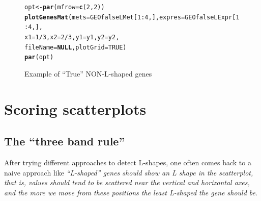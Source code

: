 \documentclass[a4paper,10pt]{article}\usepackage[]{graphicx}\usepackage[]{xcolor}
\makeatletter
\newcommand{\hlnum}[1]{\textcolor[rgb]{0.686,0.059,0.569}{#1}}%
\newcommand{\hlopt}[1]{\textcolor[rgb]{0,0,0}{#1}}%
\newcommand{\hlstd}[1]{\textcolor[rgb]{0.345,0.345,0.345}{#1}}%
\newcommand{\hlkwa}[1]{\textcolor[rgb]{0.161,0.373,0.58}{\textbf{#1}}}%
\newcommand{\hlkwb}[1]{\textcolor[rgb]{0.69,0.353,0.396}{#1}}%
\newcommand{\hlkwc}[1]{\textcolor[rgb]{0.333,0.667,0.333}{#1}}%
\newcommand{\hlkwd}[1]{\textcolor[rgb]{0.737,0.353,0.396}{\textbf{#1}}}%
\newenvironment{kframe}{%
 \def\at@end@of@kframe{}%
 \ifinner\ifhmode%
  \def\at@end@of@kframe{\end{minipage}}%
  \begin{minipage}{\columnwidth}%
 \fi\fi%
 \def\FrameCommand##1{\hskip\@totalleftmargin \hskip-\fboxsep
 \colorbox{shadecolor}{##1}\hskip-\fboxsep
     \hskip-\linewidth \hskip-\@totalleftmargin \hskip\columnwidth}%
 \MakeFramed {\advance\hsize-\width
   \@totalleftmargin\z@ \linewidth\hsize
   \@setminipage}}%
 {\par\unskip\endMakeFramed%
 \at@end@of@kframe}
\newenvironment{knitrout}{}{} %
\makeatother
\begin{document}
\begin{figure}
\centering
\begin{knitrout}
\color{fgcolor}\begin{kframe}
\begin{alltt}
\hlstd{opt}\hlkwb{<-} \hlkwd{par}\hlstd{(}\hlkwc{mfrow}\hlstd{=}\hlkwd{c}\hlstd{(}\hlnum{2}\hlstd{,}\hlnum{2}\hlstd{))}
\hlkwd{plotGenesMat} \hlstd{(}\hlkwc{mets}\hlstd{=GEOfalseLMet[}\hlnum{1}\hlopt{:}\hlnum{4}\hlstd{,],} \hlkwc{expres}\hlstd{=GEOfalseLExpr[}\hlnum{1}\hlopt{:}\hlnum{4}\hlstd{,],}
              \hlkwc{x1}\hlstd{=}\hlnum{1}\hlopt{/}\hlnum{3}\hlstd{,} \hlkwc{x2}\hlstd{=}\hlnum{2}\hlopt{/}\hlnum{3}\hlstd{,} \hlkwc{y1}\hlstd{=y1,} \hlkwc{y2}\hlstd{=y2,}
               \hlkwc{fileName}\hlstd{=}\hlkwa{NULL}\hlstd{,} \hlkwc{plotGrid} \hlstd{=} \hlnum{TRUE}\hlstd{)}
\hlkwd{par}\hlstd{(opt)}
\end{alltt}
\end{kframe}
\end{knitrout}
\caption{Example of ``True'' NON-L-shaped genes\label{Lshaped2}}
\end{figure}


\section{Scoring scatterplots}

\subsection{The ``three band rule''}

After trying different approaches to detect L-shapes, one often comes back to a naive approach like \emph{``L-shaped'' genes should show an L shape in the scatterplot, that is, values should tend to be scattered near the vertical and horizontal axes, and the more we move from these positions the least L-shaped the gene should be}.
\end{document}
